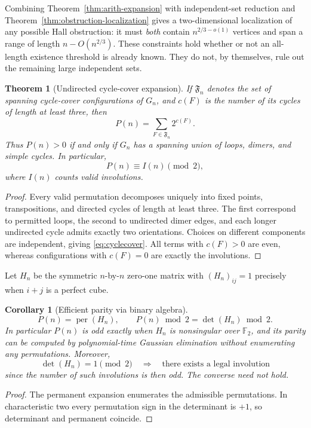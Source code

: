 \documentclass[10pt]{article}
\newtheorem{theorem}{Theorem}
\newtheorem{corollary}{Corollary}
\begin{document}
Combining Theorem~\ref{thm:arith-expansion}
with independent-set reduction and
Theorem~\ref{thm:obstruction-localization}
gives a two-dimensional localization
of any possible Hall obstruction:
it must \emph{both} contain
$n^{2/3-o(1)}$ vertices and
span a range of length
$n-O(n^{2/3})$. These constraints
hold whether or not an all-length
existence threshold is already known.
They do not, by themselves, rule out
the remaining large independent sets.

\begin{theorem}[Undirected cycle-cover expansion]
\label{thm:cyclecover}
If $\mathfrak F_n$ denotes the set of
spanning cycle-cover configurations of $G_n$,
and $c(F)$ is the number of its cycles
of length at least three, then
\begin{equation}\label{eq:cyclecover}
\boxed{P(n)=\sum_{F\in\mathfrak F_n}2^{c(F)}.}
\end{equation}
Thus $P(n)>0$ if and only if $G_n$
has a spanning union of loops, dimers,
and simple cycles. In particular,
\[
\boxed{P(n)\equiv I(n)\pmod 2,}
\]
where $I(n)$ counts valid involutions.
\end{theorem}
\begin{proof}
Every valid permutation decomposes uniquely
into fixed points, transpositions, and
directed cycles of length at least three.
The first correspond to permitted loops,
the second to undirected dimer edges,
and each longer undirected cycle admits
exactly two orientations. Choices on
different components are independent,
giving \eqref{eq:cyclecover}.
All terms with $c(F)>0$ are even,
whereas configurations with $c(F)=0$
are exactly the involutions.
\end{proof}

Let $H_n$ be the symmetric $n$-by-$n$
zero-one matrix with
$(H_n)_{ij}=1$ precisely when $i+j$
is a perfect cube.

\begin{corollary}[Efficient parity via binary algebra]
\label{cor:parity}
\[
\boxed{P(n)=\operatorname{per}(H_n),\qquad
P(n)\bmod2=\det(H_n)\bmod2.}
\]
In particular $P(n)$ is odd exactly
when $H_n$ is nonsingular over
$\mathbb F_2$, and its parity can be
computed by polynomial-time Gaussian
elimination without enumerating
any permutations. Moreover,
\[
\det(H_n)=1\pmod2
\quad\Longrightarrow\quad
\text{there exists a legal involution}
\]
since the number of such involutions
is then odd. The converse need not hold.
\end{corollary}
\begin{proof}
The permanent expansion enumerates
the admissible permutations. In
characteristic two every permutation
sign in the determinant is $+1$,
so determinant and permanent coincide.
\end{proof}
\end{document}
